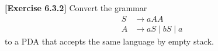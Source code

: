 \textbf{[Exercise 6.3.2]} Convert the grammar
\begin{align*}
    S &\rightarrow aAA\\
    A &\rightarrow aS \mid bS \mid a
\end{align*}
to a PDA that accepts the same language by empty stack.